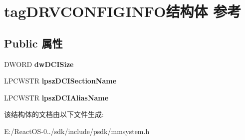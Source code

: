 \hypertarget{structtag_d_r_v_c_o_n_f_i_g_i_n_f_o}{}\section{tag\+D\+R\+V\+C\+O\+N\+F\+I\+G\+I\+N\+F\+O结构体 参考}
\label{structtag_d_r_v_c_o_n_f_i_g_i_n_f_o}
\subsection*{Public 属性}
\begin{DoxyCompactItemize}
\item 
\mbox{\label{structtag_d_r_v_c_o_n_f_i_g_i_n_f_o_aa9dc82e9938180821a7b256c683e2d2c}} 
D\+W\+O\+RD {\bfseries dw\+D\+C\+I\+Size}
\item 
\mbox{\label{structtag_d_r_v_c_o_n_f_i_g_i_n_f_o_a049569fab1940803678f81a1cac3876a}} 
L\+P\+C\+W\+S\+TR {\bfseries lpsz\+D\+C\+I\+Section\+Name}
\item 
\mbox{\label{structtag_d_r_v_c_o_n_f_i_g_i_n_f_o_a03ec442279dc4d391fa48f119bc01256}} 
L\+P\+C\+W\+S\+TR {\bfseries lpsz\+D\+C\+I\+Alias\+Name}
\end{DoxyCompactItemize}


该结构体的文档由以下文件生成\+:\begin{DoxyCompactItemize}
\item 
E\+:/\+React\+O\+S-\/0../sdk/include/psdk/mmsystem.\+h\end{DoxyCompactItemize}
